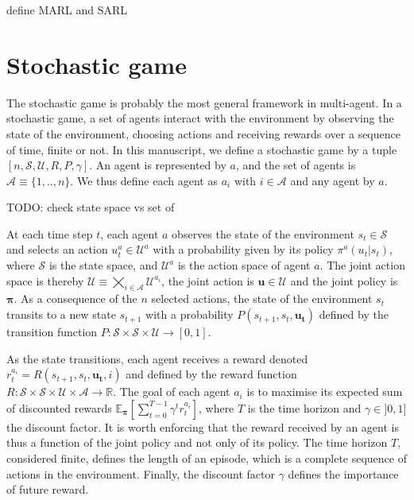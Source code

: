 define MARL and SARL

\section{Stochastic game}
\label{sec:ch2_stochastic_Game}
The stochastic game \citep{stochasticGames} is probably the most general framework in multi-agent.
In a stochastic game, a set of agents interact with the environment by observing the state of the environment, choosing actions and receiving rewards over a sequence of time, finite or not.
In this manuscript, we define a stochastic game by a tuple $[n, \mathcal{S}, \mathcal{U}, R, P, \gamma]$.
An agent is represented by $a$, and the set of agents is $\mathcal{A} \equiv \{1,..,n\}$.
We thus define each agent as $a_i$ with $i \in \mathcal{A}$ and any agent by $a$.

TODO: check state space vs set of 

At each time step $t$, each agent $a$ observes the state of the environment $s_t \in \mathcal{S}$ and selects an action $u_t^a \in \mathcal{U}^a$ with a probability given by its policy $\pi^a(u_t|s_t)$, where $\mathcal{S}$ is the state space, and $\mathcal{U}^a$ is the action space of agent $a$.
The joint action space is thereby $\mathcal{U} \equiv \bigtimes_{i \in \mathcal{A}} \mathcal{U}^{a_i}$, the joint action is $\mathbf{u} \in \mathcal{U}$ and the joint policy is $\mathbf{\pi}$.
As a consequence of the $n$ selected actions, the state of the environment $s_t$ transits to a new state $s_{t+1}$ with a probability $P(s_{t+1}, s_t, \mathbf{u_t})$ defined by the transition function $P:\mathcal{S} \times \mathcal{S} \times \mathcal{U} \rightarrow [0,1]$.

As the state transitions, each agent receives a reward denoted $r_t^{a_i} = R(s_{t+1}, s_t, \mathbf{u_t}, i)$ and defined by the reward function $R: \mathcal{S} \times \mathcal{S} \times \mathcal{U} \times \mathcal{A} \rightarrow \mathbb{R}$.
The goal of each agent $a_i$ is to maximise its expected sum of discounted rewards $\mathbb{E}_{\mathbf{\pi}}\left[ \sum_{t=0}^{T-1} \gamma^t r^{a_i}_t \right]$, where $T$ is the time horizon and $\gamma \in ]0, 1]$ the discount factor.
It is worth enforcing that the reward received by an agent is thus a function of the joint policy and not only of its policy.
The time horizon $T$, considered finite, defines the length of an episode, which is a complete sequence of actions in the environment.
Finally, the discount factor $\gamma$ defines the importance of future reward.

